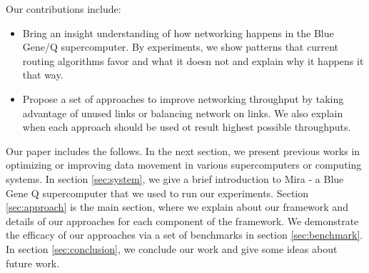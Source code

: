 Our contributions include:
\begin{itemize}
\item Bring an insight understanding of how networking happens in the Blue Gene/Q supercomputer. By experiments, we show patterns that current routing algorithms favor and what it doesn not and explain why it happens it that way.
\item Propose a set of approaches to improve networking throughput by taking advantage of unused links or balancing network on links. We also explain when each approach should be used ot result highest possible throughputs.
\end{itemize}

Our paper includes the follows. In the next section, we present previous works in optimizing or improving data movement in various supercomputers or computing systems. In section \ref{sec:system}, we give a brief introduction to Mira - a Blue Gene Q supercomputer that we used to run our experiments. Section \ref{sec:approach} is the main section, where we explain about our framework and details of our approaches for each component of the framework. We demonstrate the efficacy of our approaches via a set of benchmarks in section \ref{sec:benchmark}. In section \ref{sec:conclusion}, we conclude our work and give some ideas about future work.
